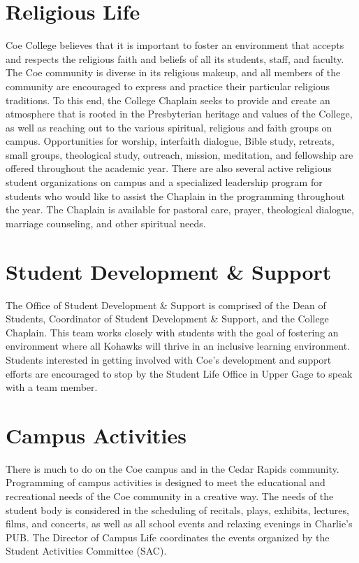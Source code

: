 \documentclass[
  letterpaper,
]{scrbook}
\begin{document}
\section{Religious Life}\label{religious-life}

Coe College believes that it is important to foster an environment that
accepts and respects the religious faith and beliefs of all its
students, staff, and faculty. The Coe community is diverse in its
religious makeup, and all members of the community are encouraged to
express and practice their particular religious traditions. To this end,
the College Chaplain seeks to provide and create an atmosphere that is
rooted in the Presbyterian heritage and values of the College, as well
as reaching out to the various spiritual, religious and faith groups on
campus. Opportunities for worship, interfaith dialogue, Bible study,
retreats, small groups, theological study, outreach, mission,
meditation, and fellowship are offered throughout the academic year.
There are also several active religious student organizations on campus
and a specialized leadership program for students who would like to
assist the Chaplain in the programming throughout the year. The Chaplain
is available for pastoral care, prayer, theological dialogue, marriage
counseling, and other spiritual needs.

\section{Student Development \&
Support}\label{student-development-support}

The Office of Student Development \& Support is comprised of the Dean of
Students, Coordinator of Student Development \& Support, and the College
Chaplain. This team works closely with students with the goal of
fostering an environment where all Kohawks will thrive in an inclusive
learning environment. Students interested in getting involved with Coe's
development and support efforts are encouraged to stop by the Student
Life Office in Upper Gage to speak with a team member.

\section{Campus Activities}\label{campus-activities}

There is much to do on the Coe campus and in the Cedar Rapids community.
Programming of campus activities is designed to meet the educational and
recreational needs of the Coe community in a creative way. The needs of
the student body is considered in the scheduling of recitals, plays,
exhibits, lectures, films, and concerts, as well as all school events
and relaxing evenings in Charlie's PUB. The Director of Campus Life
coordinates the events organized by the Student Activities Committee
(SAC).
\end{document}
